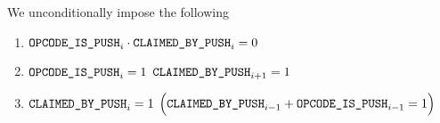We unconditionally impose the following
\begin{enumerate}
    \item $\texttt{OPCODE\_IS\_PUSH} _{i} \cdot \texttt{CLAIMED\_BY\_PUSH} _{i} = 0$
    \item \If $\texttt{OPCODE\_IS\_PUSH} _{i} = 1$ \Then $\texttt{CLAIMED\_BY\_PUSH} _{i + 1} = 1$
    \item \If $\texttt{CLAIMED\_BY\_PUSH} _{i} = 1$ \Then $\Big(\texttt{CLAIMED\_BY\_PUSH} _{i - 1} + \texttt{OPCODE\_IS\_PUSH} _{i - 1} = 1\Big)$
\end{enumerate}
